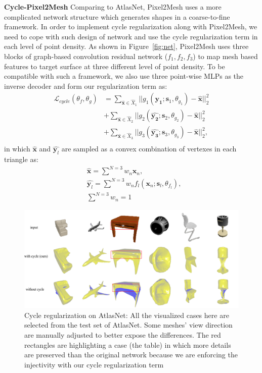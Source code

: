 \noindent\textbf{Cycle-Pixel2Mesh}
Comparing to AtlasNet, Pixel2Mesh uses a more complicated network structure which generates shapes in a coarse-to-fine framework. In order to implement cycle regularization along with Pixel2Mesh, we need to cope with such design of network and use the cycle regularization term in each level of point density.
As shown in Figure~\ref{fig:net}, Pixel2Mesh uses three blocks of graph-based convolution residual network ($f_1,f_2,f_3$) to map mesh based features to target surface at three different level of point density. To be compatible with such a framework, we also use three point-wise MLPs as the inverse decoder and form our regularization term as:
\begin{equation}
\begin{aligned}
\mathcal{L}_{cycle}(\theta_f,\theta_g) 
&= \sum_{\hat{\mathbf{x}} \in \hat{X}_1}||g_{1}(\hat{\mathbf{y_1}};\mathbf{s}_1,\theta_{g_1}) - \hat{\mathbf{x}}||_2^2\\
&+ \sum_{\hat{\mathbf{x}} \in \hat{X}_2}||g_{2}(\hat{\mathbf{y_2}};\mathbf{s}_2,\theta_{g_2}) - \hat{\mathbf{x}}||_2^2\\
&+ \sum_{\hat{\mathbf{x}} \in \hat{X}_3}||g_{3}(\hat{\mathbf{y_3}};\mathbf{s}_3,\theta_{g_3}) - \hat{\mathbf{x}}||_2^2,\\
\end{aligned}
\end{equation}
in which $\hat{\mathbf{x}}$ and $\hat{\mathbf{y}_l}$ are sampled as a convex combination of vertexes in each triangle as:
\begin{equation}
\begin{aligned}
&\hat{\mathbf{x}} = \sum^{N=3} w_n\mathbf{x}_n, \\
&\hat{\mathbf{y}_l} = \sum^{N=3} w_nf_l(\mathbf{x}_n;\mathbf{s}_l,\theta_{f_l}),\\
&\sum^{N=3} w_n = 1
\end{aligned}
\end{equation}
\begin{figure}[t]
	\centering
	\includegraphics[width=\linewidth]{img/atlas/svr}
	\caption{Cycle regularization on AtlasNet: All the visualized cases here are selected from the test set of AtlasNet. Some meshes' view direction are manually adjusted to better expose the differences. The red rectangles are highlighting a case (the table) in which more details are preserved than the original network because we are enforcing the injectivity with our cycle regularization term}
	\label{fig:svr}
\end{figure}
